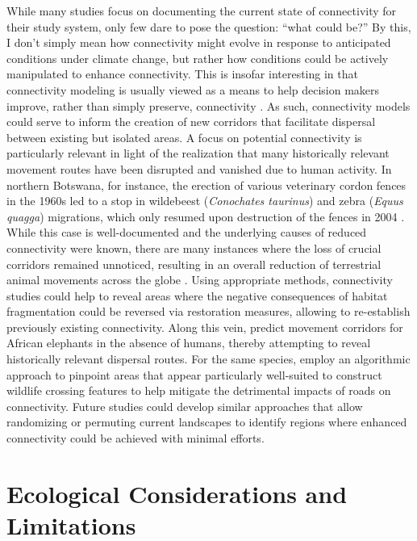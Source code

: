 \documentclass[../FinalThesis.tex]{subfiles}
\begin{document}
While many studies focus on documenting the current state of connectivity for
their study system, only few dare to pose the question: ``what could be?'' By
this, I don't simply mean how connectivity might evolve in response to
anticipated conditions under climate change, but rather how conditions could be
actively manipulated to enhance connectivity. This is insofar interesting in
that connectivity modeling is usually viewed as a means to help decision makers
improve, rather than simply preserve, connectivity \citep{Heller.2009,
Rudnick.2012}. As such, connectivity models could serve to inform the creation
of new corridors that facilitate dispersal between existing but isolated areas.
A focus on potential connectivity is particularly relevant in light of the
realization that many historically relevant movement routes have been disrupted
and vanished due to human activity. In northern Botswana, for instance, the
erection of various veterinary cordon fences in the 1960s led to a stop in
wildebeest (\textit{Conochates taurinus}) and zebra (\textit{Equus quagga})
migrations, which only resumed upon destruction of the fences in 2004
\citep{Bartlam-Brooks.2011, Bartlam-Brooks.2013}. While this case is
well-documented and the underlying causes of reduced connectivity were known,
there are many instances where the loss of crucial corridors remained unnoticed,
resulting in an overall reduction of terrestrial animal movements across the
globe \citep{Tucker.2018}. Using appropriate methods, connectivity studies could
help to reveal areas where the negative consequences of habitat fragmentation
could be reversed via restoration measures, allowing to re-establish previously
existing connectivity. Along this vein, \citet{Cushman.2010a} predict movement
corridors for African elephants in the absence of humans, thereby attempting to
reveal historically relevant dispersal routes. For the same species,
\citet{Bastille-Rousseau.2018a} employ an algorithmic approach to pinpoint areas
that appear particularly well-suited to construct wildlife crossing features to
help mitigate the detrimental impacts of roads on connectivity. Future studies
could develop similar approaches that allow randomizing or permuting current
landscapes to identify regions where enhanced connectivity could be achieved
with minimal efforts.

\section{Ecological Considerations and Limitations}
\end{document}
